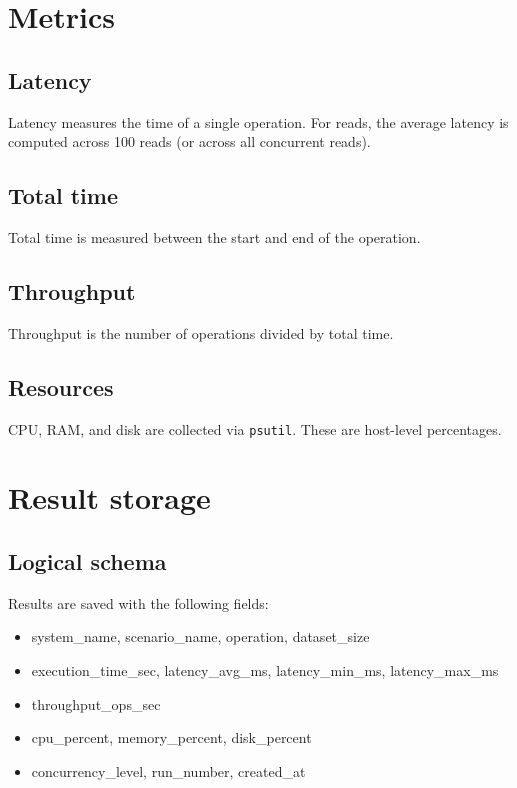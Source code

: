 \documentclass[12pt]{report}
\begin{document}
\chapter{Metrics}
\section{Latency}
Latency measures the time of a single operation. For reads, the average latency is computed across
100 reads (or across all concurrent reads).

\section{Total time}
Total time is measured between the start and end of the operation.

\section{Throughput}
Throughput is the number of operations divided by total time.

\section{Resources}
CPU, RAM, and disk are collected via \texttt{psutil}. These are host-level percentages.

\chapter{Result storage}
\section{Logical schema}
Results are saved with the following fields:
\begin{itemize}
  \item system\_name, scenario\_name, operation, dataset\_size
  \item execution\_time\_sec, latency\_avg\_ms, latency\_min\_ms, latency\_max\_ms
  \item throughput\_ops\_sec
  \item cpu\_percent, memory\_percent, disk\_percent
  \item concurrency\_level, run\_number, created\_at
\end{itemize}
\end{document}
